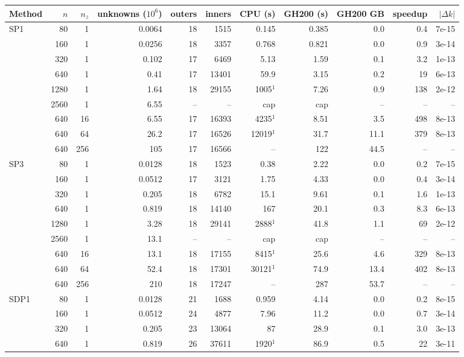 \begin{tabular}{lrrrrrrrrrr}
\hline
Method & $n$ & $n_z$ & unknowns ($10^6$) & outers & inners & CPU (s) & GH200 (s) & GH200 GB & speedup & $|\Delta k|$ \\
\hline
SP1 & 80 & 1 & 0.0064 & 18 & 1515 & 0.145 & 0.385 & 0.0 & 0.4 & 7e-15 \\
 & 160 & 1 & 0.0256 & 18 & 3357 & 0.768 & 0.821 & 0.0 & 0.9 & 3e-14 \\
 & 320 & 1 & 0.102 & 17 & 6469 & 5.13 & 1.59 & 0.1 & 3.2 & 1e-13 \\
 & 640 & 1 & 0.41 & 17 & 13401 & 59.9 & 3.15 & 0.2 & 19 & 6e-13 \\
 & 1280 & 1 & 1.64 & 18 & 29155 & 1005$^1$ & 7.26 & 0.9 & 138 & 2e-12 \\
 & 2560 & 1 & 6.55 & -- & -- & cap & cap & -- & -- & -- \\
 & 640 & 16 & 6.55 & 17 & 16393 & 4235$^1$ & 8.51 & 3.5 & 498 & 8e-13 \\
 & 640 & 64 & 26.2 & 17 & 16526 & 12019$^1$ & 31.7 & 11.1 & 379 & 8e-13 \\
 & 640 & 256 & 105 & 17 & 16566 & -- & 122 & 44.5 & -- & -- \\
SP3 & 80 & 1 & 0.0128 & 18 & 1523 & 0.38 & 2.22 & 0.0 & 0.2 & 7e-15 \\
 & 160 & 1 & 0.0512 & 17 & 3121 & 1.75 & 4.33 & 0.0 & 0.4 & 3e-14 \\
 & 320 & 1 & 0.205 & 18 & 6782 & 15.1 & 9.61 & 0.1 & 1.6 & 1e-13 \\
 & 640 & 1 & 0.819 & 18 & 14140 & 167 & 20.1 & 0.3 & 8.3 & 6e-13 \\
 & 1280 & 1 & 3.28 & 18 & 29141 & 2888$^1$ & 41.8 & 1.1 & 69 & 2e-12 \\
 & 2560 & 1 & 13.1 & -- & -- & cap & cap & -- & -- & -- \\
 & 640 & 16 & 13.1 & 18 & 17155 & 8415$^1$ & 25.6 & 4.6 & 329 & 8e-13 \\
 & 640 & 64 & 52.4 & 18 & 17301 & 30121$^1$ & 74.9 & 13.4 & 402 & 8e-13 \\
 & 640 & 256 & 210 & 18 & 17247 & -- & 287 & 53.7 & -- & -- \\
SDP1 & 80 & 1 & 0.0128 & 21 & 1688 & 0.959 & 4.14 & 0.0 & 0.2 & 8e-15 \\
 & 160 & 1 & 0.0512 & 24 & 4877 & 7.96 & 11.2 & 0.0 & 0.7 & 3e-14 \\
 & 320 & 1 & 0.205 & 23 & 13064 & 87 & 28.9 & 0.1 & 3.0 & 3e-13 \\
 & 640 & 1 & 0.819 & 26 & 37611 & 1920$^1$ & 86.9 & 0.5 & 22 & 3e-11 \\

\end{tabular}
